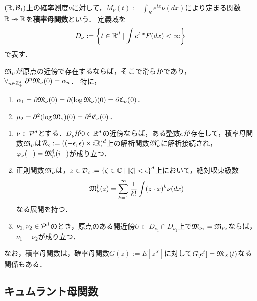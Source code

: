 \documentclass[uplatex,dvipdfmx]{jsreport}
\begin{document}
\begin{definition}
    $(\R,\B_1)$上の確率測度$\nu$に対して，$M_\nu(t):=\int_R e^{tx}\nu(dx)$により定まる関数$\R\nrightarrow\R$を\textbf{積率母関数}という．
    定義域を
    \[D_\nu:=\Brace{t\in\R^d\mid\int e^{t\cdot x}F(dx)<\infty}\]
    で表す．
\end{definition}

\begin{lemma}[マクローリン展開係数は積率である]
    $\fM_\nu$が原点の近傍で存在するならば，そこで滑らかであり，$\forall_{n\in\Z^d_+}\;\partial^n\fM_\nu(0)=\al_n$．
    特に，
    \begin{enumerate}
        \item $\al_1=\partial\fM_\nu(0)=\partial(\log\fM_\nu)(0)=\partial\fC_\nu(0)$．
        \item $\mu_2=\partial^2(\log\fM_\nu)(0)=\partial^2\fC_\nu(0)$．
    \end{enumerate}
\end{lemma}

\begin{theorem}[特性関数との関係と一意性定理]\mbox{}
    \begin{enumerate}
        \item $\nu\in\P^d$とする．$D_\nu$が$0\in\R^d$の近傍ならば，ある整数$\ep$が存在して，積率母関数$\fM_\nu$は$\cR_\ep:=((-\ep,\ep)\times i\R)^d$上の解析関数$\fM^\dagger_\nu$に解析接続され，$\varphi_\nu(-)=\fM^\dagger_\nu(i-)$が成り立つ．
        \item 正則関数$\fM^\dagger_\nu$は，$z\in\D_\ep:=\Brace{\zeta\in\C\mid\abs{\zeta}<\ep}^d$上において，絶対収束級数
        \[\fM^\dagger_\nu(z)=\sum^\infty_{k=1}\frac{1}{k!}\int(z\cdot x)^k\nu(dx)\]
        なる展開を持つ．
        \item $\nu_1,\nu_2\in\P^d$のとき，原点のある開近傍$U\subset D_{\nu_1}\cap D_{\nu_2}$上で$\fM_{\nu_1}=\fM_{\nu_2}$ならば，$\nu_1=\nu_2$が成り立つ．
    \end{enumerate}
\end{theorem}

\begin{remark}
    なお，積率母関数は，確率母関数$G(z):=E[z^X]$に対して$G[e^t]=\fM_X(t)$なる関係もある．
\end{remark}

\subsection{キュムラント母関数}
\end{document}
